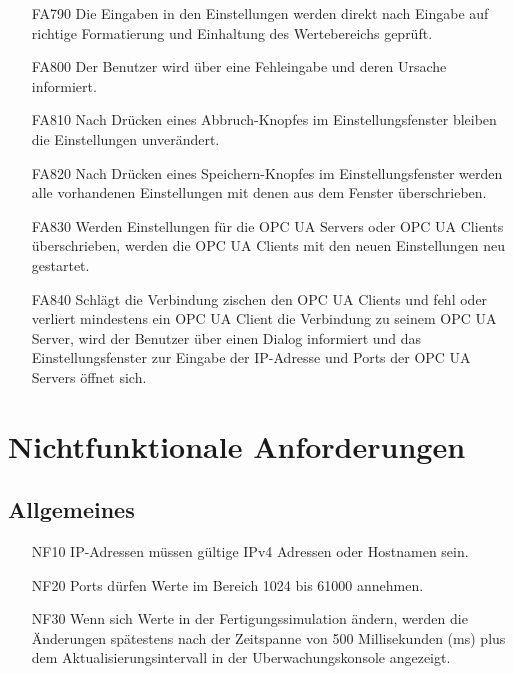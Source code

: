 \documentclass[parskip=full]{scrartcl}
\begin{document}
\begin{enumerate}
  \item[FA790] Die Eingaben in den Einstellungen werden direkt nach Eingabe auf richtige Formatierung und Einhaltung des Wertebereichs gepr\"uft.
  \item[FA800] Der Benutzer wird über eine Fehleingabe und deren Ursache informiert.
  \item[FA810] Nach Drücken eines Abbruch-Knopfes im Einstellungsfenster bleiben die Einstellungen unverändert.
  \item[FA820] Nach Drücken eines Speichern-Knopfes im Einstellungsfenster werden alle vorhandenen Einstellungen mit denen aus dem Fenster überschrieben.
  \item[FA830] Werden Einstellungen für die \glspl{OPC UA Server} oder \glspl{OPC UA Client} überschrieben, werden die \glspl{OPC UA Client} mit den neuen Einstellungen neu gestartet.
  \item[FA840] Schlägt die Verbindung zischen den \glspl{OPC UA Client} und  fehl oder verliert mindestens ein \gls{OPC UA Client} die Verbindung zu seinem \gls{OPC UA Server}, wird 
    der Benutzer über einen Dialog informiert und das Einstellungsfenster zur Eingabe der \gls{IP-Adresse} und Ports der \glspl{OPC UA Server} öffnet sich.
\end{enumerate}

\pagebreak
\section{Nichtfunktionale Anforderungen}
\subsection{Allgemeines}
\begin{enumerate}
  \item[NF10] IP-Adressen müssen gültige IPv4 Adressen oder Hostnamen sein.
  \item[NF20] Ports dürfen Werte im Bereich 1024 bis 61000 annehmen.
  \item[NF30] Wenn sich Werte in der \gls{Fertigungssimulation} ändern, werden die Änderungen spätestens nach der Zeitspanne von 500 Millisekunden (ms) plus dem Aktualisierungsintervall in der \gls{Uberwachungskonsole} angezeigt.
\end{enumerate}
\end{document}
